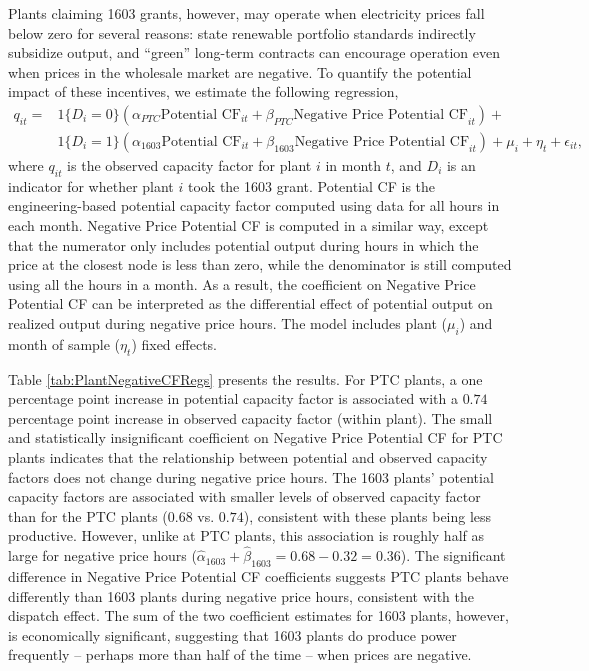 \documentclass[12pt]{article}
\begin{document}
Plants claiming 1603 grants, however, may operate when electricity prices fall below zero for several reasons: state renewable portfolio standards indirectly subsidize output, and ``green'' long-term contracts can encourage operation even when prices in the wholesale market are negative. To quantify the potential impact of these incentives, we estimate the following regression, 
\begin{align*} \label{eq:ptnl_cf_regs}
  q_{it}= &1\{D_i = 0 \} \left( \alpha_{PTC} \mbox{Potential CF}_{it} + \beta_{PTC} \mbox{Negative Price Potential CF}_{it} \right) + \\
      &1\{D_i = 1 \} \left( \alpha_{1603} \mbox{Potential CF}_{it} + \beta_{1603} \mbox{Negative Price Potential CF}_{it} \right) + \mu_{i} + \eta_{t} +\epsilon_{it} , 
\end{align*}
where $q_{it}$ is the observed capacity factor for plant $i$ in month $t$, and $D_i$ is an indicator for whether plant $i$ took the 1603 grant. Potential CF is the engineering-based potential capacity factor computed using data for all hours in each month. Negative Price Potential CF is computed in a similar way, except that the numerator only includes potential output during hours in which the price at the closest node is less than zero, while the denominator is still computed using all the hours in a month. As a result, the coefficient on Negative Price Potential CF can be interpreted as the differential effect of potential output on realized output during negative price hours. The model includes plant ($\mu_i$) and month of sample ($\eta_t$) fixed effects. 

Table \ref{tab:PlantNegativeCFRegs} presents the results. For PTC plants, a one percentage point increase in potential capacity factor is associated with a $0.74$ percentage point increase in observed capacity factor (within plant). The small and statistically insignificant coefficient on Negative Price Potential CF for PTC plants indicates that the relationship between potential and observed capacity factors does not change during negative price hours. The 1603 plants' potential capacity factors are associated with smaller levels of observed capacity factor than for the PTC plants ($0.68$ vs. $0.74$), consistent with these plants being less productive. However, unlike at PTC plants, this association is roughly half as large for negative price hours ($\hat{\alpha}_{1603} + \hat{\beta}_{1603} = 0.68-0.32 = 0.36$). The significant difference in Negative Price Potential CF coefficients suggests PTC plants behave differently than 1603 plants during negative price hours, consistent with the dispatch effect. The sum of the two coefficient estimates for 1603 plants, however, is economically significant, suggesting that 1603 plants do produce power frequently -- perhaps more than half of the time -- when prices are negative.
\end{document}
